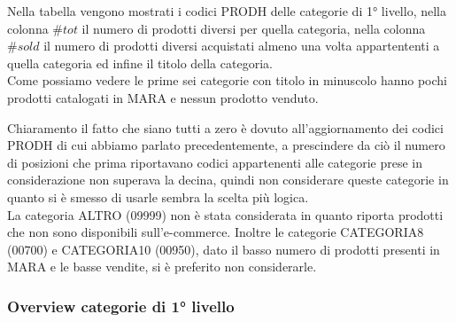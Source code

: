 \begin{minipage}[H]{0.4\textwidth}
{}
\end{minipage}
\begin{minipage}[H]{0.6\textwidth}
	Nella tabella vengono mostrati i codici PRODH delle categorie di 1° livello, nella colonna $\#tot$ il numero di prodotti diversi per quella categoria, nella colonna $\#sold$ il numero di prodotti diversi acquistati almeno una volta appartententi a quella categoria ed infine il titolo della categoria.\\
	Come possiamo vedere le prime sei categorie con titolo in minuscolo hanno pochi prodotti catalogati in MARA e nessun prodotto venduto.\\
\end{minipage}
Chiaramento il fatto che siano tutti a zero è dovuto all'aggiornamento dei codici PRODH di cui abbiamo parlato precedentemente, a prescindere da ciò il numero di posizioni che prima riportavano codici appartenenti alle categorie prese in considerazione non superava la decina, quindi non considerare queste categorie in quanto si è smesso di usarle sembra la scelta più logica.\\
La categoria ALTRO (09999) non è stata considerata in quanto riporta prodotti che non sono disponibili sull'e-commerce.
Inoltre le categorie CATEGORIA8 (00700) e CATEGORIA10 (00950), dato il basso numero di prodotti presenti in MARA e le basse vendite, si è preferito non considerarle.
\subsubsection{Overview categorie di 1° livello}

